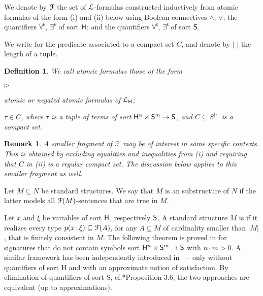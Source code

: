 \documentclass{amsproc}
\newcommand{\mylabel}[1]{{#1}\hfill}
\renewenvironment{itemize}
  {\begin{list}{$\triangleright$}{%
  \setlength{\parskip}{0mm}
  \setlength{\topsep}{.1\baselineskip}
  \setlength{\rightmargin}{0mm}
  \setlength{\listparindent}{0mm}
  \setlength{\itemindent}{0mm}
  \setlength{\labelwidth}{3ex}
  \setlength{\itemsep}{.1\baselineskip}
  \setlength{\parsep}{.1\baselineskip}
  \setlength{\partopsep}{0mm}
  \setlength{\labelsep}{1ex}
  \setlength{\leftmargin}{\labelwidth+\labelsep}
  \let\makelabel\mylabel}}{%
\end{list}}
\newcounter{thm}
\theoremstyle{mio}
\newtheorem{definition}[thm]{Definition}\tcolorboxenvironment{definition}{mythm}
\newtheorem{remark}[thm]{Remark}\tcolorboxenvironment{remark}{mythm}
\renewcommand*{\emph}[1]{%
   \smash{\tikz[baseline]\node[rectangle, fill=teal!25, rounded corners, inner xsep=0.5ex, inner ysep=0.2ex, anchor=base, minimum height = 2.7ex]{\strut #1};}}
\begin{document}
We denote by ${\EuScript F}$ the set of ${\EuScript L}$-formulas constructed inductively from atomic formulas of the form (i) and (ii) below using Boolean connectives $\wedge$, $\vee$; the quantifiers $\forall\raisebox{1.1ex}{\scaleto{\sf H}{.8ex}\kern-.2ex}$, $\exists\raisebox{1.1ex}{\scaleto{\sf H}{.8ex}\kern-.2ex}$ of sort ${\sf H}$; and the quantifiers $\forall\raisebox{1.1ex}{\scaleto{\sf S}{.8ex}\kern-.2ex}$, $\exists\raisebox{1.1ex}{\scaleto{\sf S}{.8ex}\kern-.2ex}$ of sort ${\sf S}$.

We write \emph{$x\in C$\/} for the predicate associated to a compact set $C$, and denote by $|\mbox{-}|$ the length of a tuple.

\begin{definition}
  We call atomic formulas those of the form
  \begin{itemize}
  \item[i.] atomic or negated atomic formulas of ${\EuScript L}_{\sf H}$;
  \item[ii.] $\tau\in C$, where $\tau$ is a tuple of terms of sort ${\sf H}^n\times {\sf S}^m\to {\sf S}$, and $C\subseteq S^{|\tau|}$ is a compact set.
  \end{itemize}
\end{definition}

\begin{remark}
  A smaller fragment of ${\EuScript F}$ may be of interest in some specific contexts.
  This is obtained by excluding equalities and inequalities from (i) and requiring that $C$ in (ii) is a regular compact set.
  The discussion below applies to this smaller fragment as well.
\end{remark}

 Let $M\subseteq N$ be standard structures.
 We say that $M$ is an \emph{${\EuScript F}$-elementary\/} substructure of $N$ if the latter models all ${\EuScript F}(M)$-sentences that are true in $M$.

 Let $x$ and $\xi$ be variables of sort ${\sf H}$, respectively ${\sf S}$.
 A standard structure $M$ is \emph{${\EuScript F}$-saturated\/} if it realizes every type $p(x\,;\xi)\subseteq{\EuScript F}(A)$, for any $A\subseteq M$ of cardinality smaller than $|M|$, that is finitely consistent in $M$.
 The following theorem is proved in \cite{clcl} for signatures that do not contain symbols sort ${\sf H}^n\times{\sf S}^m\to {\sf S}$ with $n{\cdot}m>0$.
 A similar framework has been independently introduced in \cite{PC}~--~only without quantifiers of sort {\sf H} and with an approximate notion of satisfaction.
 By elimination of quantifiers of sort {\sf S}, cf.\@ \cite{clcl}*{Proposition 3.6}, the two approaches are equivalent (up to approximations).
\end{document}
